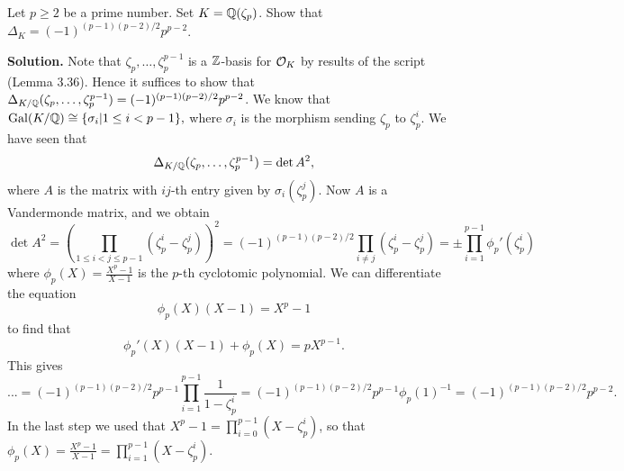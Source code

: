\documentclass[a4paper,11pt]{article}
\begin{document}
Let $p \geq 2$ be a prime number. Set $K = \mathbb{Q}(\zeta_p)$. Show that 
$\Delta_K = (-1)^{(p-1)(p-2)/2}p^{p-2}$.

\textbf{Solution.}
Note that $\zeta_p, \dots, \zeta_p^{p-1}$ is a $\mathbb{Z}$-basis for $\mathcal{O}_K$ by results of the
script (Lemma 3.36). Hence it suffices to show that $\Delta_{K/\mathbb{Q}}(\zeta_p , \dots,
\zeta_p^{p-1}) = (-1)^{(p-1)(p-2)/2} p^{p-2}$. We know that 
$\operatorname{Gal}(K/\mathbb{Q}) \cong \{\sigma_i | 1 \leq i < p-1\},$ where $\sigma_i$ is the morphism 
sending $\zeta_p$ to $\zeta_p^i$. 
We have seen that 
$$\Delta_{K/\mathbb{Q}}(\zeta_p, \dots, \zeta_p^{p-1}) = \det A^2,$$ where $A$ is the
matrix with $ij$-th entry given by $\sigma_i(\zeta_p^j)$. Now $A$ is a
Vandermonde matrix, and we obtain
\begin{equation*}
    \det A^2 = \left(\prod_{1 \leq i < j \leq p-1} (\zeta_p^i - \zeta_p^j) \right)^2
    = (-1)^{(p-1)(p-2)/2} \prod_{i \neq j} (\zeta_p^i - \zeta_p^j) = \pm \prod_{i=1}^{p-1}
        \phi_p'(\zeta_p^i) 
\end{equation*}
where $\phi_p(X) = \frac{X^p-1}{X-1}$ is the $p$-th cyclotomic polynomial. 
We can differentiate the equation
\begin{equation*}
    \phi_p(X) (X-1) = X^p-1
\end{equation*}
to find that 
$$\phi_p'(X)(X-1) + \phi_p(X) = pX^{p-1}.$$ 
This gives
\begin{equation*}
    ... = (-1)^{(p-1)(p-2)/2} p^{p-1} \prod_{i=1}^{p-1} \frac 1{1 - \zeta_p^i}
    = (-1)^{(p-1)(p-2)/2} p^{p-1}\phi_p(1)^{-1} =  (-1)^{(p-1)(p-2)/2} p^{p-2}.
\end{equation*}
In the last step we used that $X^p-1 = \prod_{i=0}^{p-1} (X- \zeta_p^i)$, 
so that $\phi_p(X) = \frac{X^p-1}{X-1} = \prod_{i=1}^{p-1} (X- \zeta_p^i)$.




\contactend
\end{document}
